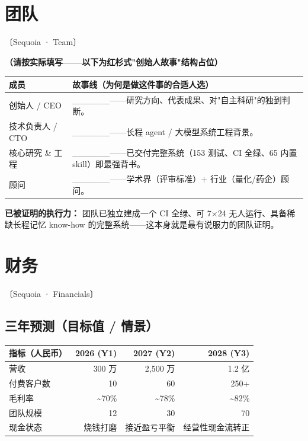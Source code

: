 \documentclass[UTF8,11pt,fontset=none]{ctexart}
\newcommand{\thd}[1]{\textbf{\color{white}#1}}
\newcommand{\headrow}{\rowcolor{argusnavy}}
\newcommand{\altrow}{\rowcolor{arguslight}}
\newcommand{\sq}[1]{\hfill{\sffamily\footnotesize\color{argusgray}〔Sequoia · #1〕}}
\begin{document}
\section{团队}\sq{Team}

\textbf{（请按实际填写——以下为红杉式"创始人故事"结构占位）}

\begin{tabularx}{\textwidth}{@{}>{\raggedright\arraybackslash}p{3.4cm} X@{}}
\toprule
\headrow \thd{成员} & \thd{故事线（为何是做这件事的合适人选）} \\
\midrule
\altrow 创始人 / CEO & \_\_\_\_\_\_——研究方向、代表成果、对"自主科研"的独到判断。 \\
技术负责人 / CTO & \_\_\_\_\_\_——长程 agent / 大模型系统工程背景。 \\
\altrow 核心研究 \& 工程 & \_\_\_\_\_\_——已交付完整系统（153 测试、CI 全绿、65 内置 skill）即最强背书。 \\
顾问 & \_\_\_\_\_\_——学术界（评审标准）+ 行业（量化/药企）顾问。 \\
\bottomrule
\end{tabularx}

\begin{quotebox}
\textbf{已被证明的执行力：} 团队已独立建成一个 CI 全绿、可 7×24 无人运行、具备稀缺长程记忆 know-how 的完整系统——这本身就是最有说服力的团队证明。
\end{quotebox}

\section{财务}\sq{Financials}

\subsection{三年预测（目标值 / 情景）}

\begin{tabularx}{\textwidth}{@{}X r r r@{}}
\toprule
\headrow \thd{指标（人民币）} & \thd{2026 (Y1)} & \thd{2027 (Y2)} & \thd{2028 (Y3)} \\
\midrule
\altrow 营收 & 300 万 & 2,500 万 & 1.2 亿 \\
付费客户数 & 10 & 60 & 250+ \\
\altrow 毛利率 & \textasciitilde 70\% & \textasciitilde 78\% & \textasciitilde 82\% \\
团队规模 & 12 & 30 & 70 \\
\altrow 现金状态 & 烧钱打磨 & 接近盈亏平衡 & 经营性现金流转正 \\
\bottomrule
\end{tabularx}
\end{document}
